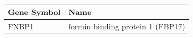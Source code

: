 \begin{tabular}{ll}
\toprule
Gene Symbol &                             Name \\
\midrule
      FNBP1 & formin binding protein 1 (FBP17) \\
\bottomrule
\end{tabular}
